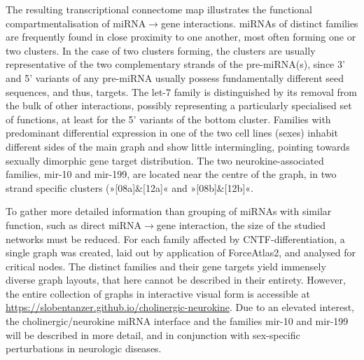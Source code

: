 The resulting transcriptional connectome map illustrates the functional compartmentalisation of miRNA$\to$gene interactions. miRNAs of distinct families are frequently found in close proximity to one another, most often forming one or two clusters. In the case of two clusters forming, the clusters are usually representative of the two complementary strands of the pre-miRNA(s), since 3' and 5' variants of any pre-miRNA usually possess fundamentally different seed sequences, and thus, targets. The let-7 family is distinguished by its removal from the bulk of other interactions, possibly representing a particularly specialised set of functions, at least for the 5' variants of the bottom cluster. Families with predominant differential expression in one of the two cell lines (sexes) inhabit different sides of the main graph and show little intermingling, pointing towards sexually dimorphic gene target distribution. The two neurokine-associated families, mir-10 and mir-199, are located near the centre of the graph, in two strand specific clusters (»[08a]\&[12a]« and »[08b]\&[12b]«.

To gather more detailed information than grouping of miRNAs with similar function, such as direct miRNA$\to$gene interaction, the size of the studied networks must be reduced. For each family affected by CNTF-differentiation, a single graph was created, laid out by application of ForceAtlas2, and analysed for critical nodes. The distinct families and their gene targets yield immensely diverse graph layouts, that here cannot be described in their entirety. However, the entire collection of graphs in interactive visual form is accessible at \url{https://slobentanzer.github.io/cholinergic-neurokine}. Due to an elevated interest, the cholinergic/neurokine miRNA interface and the families mir-10 and mir-199 will be described in more detail, and in conjunction with sex-specific perturbations in neurologic diseases.

%
%
%
